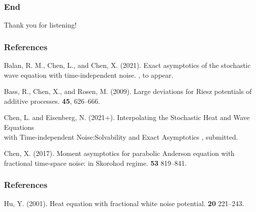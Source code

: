 \documentclass{beamer}%
\numberwithin{equation}{section}
\begin{document}
	\begin{frame}
		\frametitle{End}
		\begin{center}
			Thank you for listening!
		\end{center}
	\end{frame}
	
	\begin{frame}
		\frametitle{References}
		\small
		
		\begin{thebibliography}{999}
			Balan, R. M., Chen, L., and Chen, X. (2021).
			\newblock Exact asymptotics of the stochastic wave equation with time-independent noise.
			, to appear.
			
			Bass, R., Chen, X., and Rosen, M. (2009).
			\newblock Large deviations for Riesz potentials of additive processes.
			 \textbf{45}, 626--666.
			
			Chen, L. and Eisenberg, N. (2021+).
			\newblock Interpolating the Stochastic Heat and Wave Equations\\ with Time-independent Noise:Solvability and Exact Asymptotics
			, submitted.
			
			Chen, X. (2017).
			\newblock Moment asymptotics for parabolic Anderson equation with fractional time-space noise: in Skorohod regime.
			 {\bf 53} 819--841.
			
		\end{thebibliography}
	\end{frame}
	
	\begin{frame}[t]
		\frametitle{References}
		\small
		
		\begin{thebibliography}{999}
			Hu, Y. (2001).
			\newblock Heat equation with fractional white noise potential.
			 {\bf 20} 221--243.
		\end{thebibliography}
	\end{frame}
	
\end{document}
